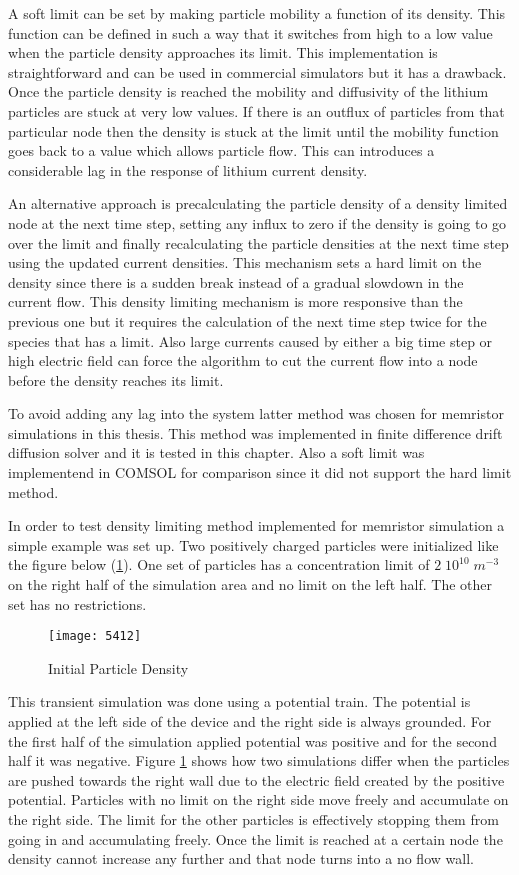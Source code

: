 \begin{doublespace}
A soft limit can be set by making particle mobility a function of its density. This function can be defined in such a way that it switches from high to a low value when the particle density approaches its limit. This implementation is straightforward and can be used in commercial simulators but it has a drawback. Once the particle density is reached the mobility and diffusivity of the lithium particles are stuck at very low values. If there is an outflux of particles from that particular node then the density is stuck at the limit until the mobility function goes back to a value which allows particle flow. This can introduces a considerable lag in the response of lithium current density.  

An alternative approach is precalculating the particle density of a density limited node at the next time step, setting any influx to zero if the density is going to go over the limit and finally recalculating the particle densities at the next time step using the updated current densities. This mechanism sets a hard limit on the density since there is a sudden break instead of a gradual slowdown in the current flow. This density limiting mechanism is more responsive than the previous one but it requires the calculation of the next time step twice for the species that has a limit. Also large currents caused by either a big time step or high electric field can force the algorithm to cut the current flow into a node before the density reaches its limit.

To avoid adding any lag into the system latter method was chosen for memristor simulations in this thesis. This method was implemented in finite difference drift diffusion solver and it is tested in this chapter. Also a soft limit was implementend in COMSOL for comparison since it did not support the hard limit method.  

In order to test density limiting method implemented for memristor simulation a simple example was set up. Two positively charged particles were initialized like the figure below (\ref{5412}). One set of particles has a concentration limit of $2 \; 10^{10} \; m^{-3}$ on the right half of the simulation area and no limit on the left half. The other set has no restrictions.
\begin{figure}[!htp]
\centering
\texttt{[image: 5412]}
\caption{Initial Particle Density} 
\label{5412}
\end{figure}

This transient simulation was done using a potential train. The potential is applied at the left side of the device and the right side is always grounded. For the first half of the simulation applied potential was positive and for the second half it was negative. Figure \ref{5412} shows how two simulations differ when the particles are pushed towards the right wall due to the electric field created by the positive potential. Particles with no limit on the right side move freely and accumulate on the right side. The limit for the other particles is effectively stopping them from going in and accumulating freely. Once the limit is reached at a certain node the density cannot increase any further and that node turns into a no flow wall. 


\end{doublespace}
